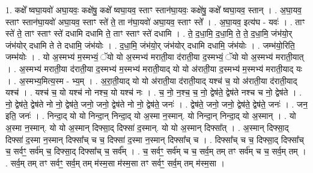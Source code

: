\documentclass[17pt]{extarticle}
\begin{document}
1. कक्षे᳚ ष्वघा॒यवो॑ अघा॒यवः॒ कक्षे॑षु॒ कक्षे᳚ ष्वघा॒यव॒ स्ताꣳ स्तान॑घा॒यवः॒ कक्षे॑षु॒ कक्षे᳚ ष्वघा॒यव॒ स्तान् । . अ॒घा॒यव॒ स्ताꣳ स्तान॑घा॒यवो॑ अघा॒यव॒ स्ताꣳ स्ते॑ ते॒ ता न॑घा॒यवो॑ अघा॒यव॒ स्ताꣳ स्ते᳚ । . अ॒घा॒यव॒ इत्य॑घ - यवः॑ । . ताꣳ स्ते॑ ते॒ ताꣳ स्ताꣳ स्ते॑ दधामि दधामि ते॒ ताꣳ स्ताꣳ स्ते॑ दधामि । . ते॒ द॒धा॒मि॒ द॒धा॒मि॒ ते॒ ते॒ द॒धा॒मि॒ जंभ॑यो॒र् जंभ॑योर् दधामि ते ते दधामि॒ जंभ॑योः । . द॒धा॒मि॒ जंभ॑यो॒र् जंभ॑योर् दधामि दधामि॒ जंभ॑योः । . जम्भ॑यो॒रिति॒ जम्भ॑योः । . यो अ॒स्मभ्य॑ म॒स्मभ्यं॒ ॅयो यो अ॒स्मभ्य॑ मराती॒या द॑राती॒या द॒स्मभ्यं॒ ॅयो यो अ॒स्मभ्य॑ मराती॒यात् । . अ॒स्मभ्य॑ मराती॒या द॑राती॒या द॒स्मभ्य॑ म॒स्मभ्य॑ मराती॒याद् यो यो अ॑राती॒या द॒स्मभ्य॑ म॒स्मभ्य॑ मराती॒याद् यः । . अ॒स्मभ्य॒मित्य॒स्म - भ्य॒म् । . अ॒रा॒ती॒याद् यो यो अ॑राती॒या द॑राती॒याद् यश्च॑ च॒ यो अ॑राती॒या द॑राती॒याद् यश्च॑ । . यश्च॑ च॒ यो यश्च॑ नो नश्च॒ यो यश्च॑ नः । . च॒ नो॒ न॒श्च॒ च॒ नो॒ द्वेष॑ते॒ द्वेष॑ते नश्च च नो॒ द्वेष॑ते । . नो॒ द्वेष॑ते॒ द्वेष॑ते नो नो॒ द्वेष॑ते॒ जनो॒ जनो॒ द्वेष॑ते नो नो॒ द्वेष॑ते॒ जनः॑ । . द्वेष॑ते॒ जनो॒ जनो॒ द्वेष॑ते॒ द्वेष॑ते॒ जनः॑ । . जन॒ इति॒ जनः॑ । . निन्दा॒द् यो यो निन्दा॒न् निन्दा॒द् यो अ॒स्मा न॒स्मान्. यो निन्दा॒न् निन्दा॒द् यो अ॒स्मान् । . यो अ॒स्मा न॒स्मान्. यो यो अ॒स्मान् दिफ्सा॒द् दिफ्सा॑ द॒स्मान्. यो यो अ॒स्मान् दिफ्सा᳚त् । . अ॒स्मान् दिफ्सा॒द् दिफ्सा॑ द॒स्मा न॒स्मान् दिफ्सा᳚च् च च॒ दिफ्सा॑ द॒स्मा न॒स्मान् दिफ्सा᳚च् च । . दिफ्सा᳚च् च च॒ दिफ्सा॒द् दिफ्सा᳚च् च॒ सर्वꣳ॒॒ सर्व॑म् च॒ दिफ्सा॒द् दिफ्सा᳚च् च॒ सर्व᳚म् । . च॒ सर्वꣳ॒॒ सर्व॑म् च च॒ सर्व॒म् तम् तꣳ सर्व॑म् च च॒ सर्व॒म् तम् । . सर्व॒म् तम् तꣳ सर्वꣳ॒॒ सर्व॒म् तम् म॑स्म॒सा म॑स्म॒सा तꣳ सर्वꣳ॒॒ सर्व॒म् तम् म॑स्म॒सा । \newline
\end{document}
